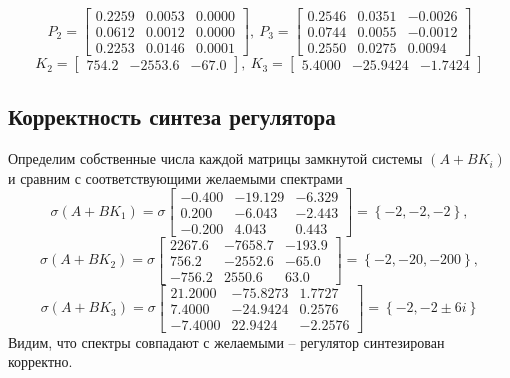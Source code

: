 \documentclass[a4paper, 12pt]{article}
\begin{document}
    $$
    P_2=\begin{bmatrix}
    0.2259    &0.0053    &0.0000\\
    0.0612    &0.0012    &0.0000\\
    0.2253    &0.0146    &0.0001
    \end{bmatrix},\ P_3=\begin{bmatrix}
    0.2546    &0.0351   &-0.0026\\
    0.0744    &0.0055   &-0.0012\\
    0.2550    &0.0275    &0.0094
    \end{bmatrix}
    $$
    $$
    K_2=\begin{bmatrix}
        754.2 &-2553.6 &-67.0
    \end{bmatrix},\ K_3=\begin{bmatrix}
        5.4000  &-25.9424   &-1.7424
    \end{bmatrix}
    $$


    \subsection{Корректность синтеза регулятора}
    Определим собственные числа каждой матрицы замкнутой системы $\left(A+BK_i\right)$ и
    сравним с соответствующими желаемыми спектрами
    $$
    \sigma\left(A+BK_1\right)=\sigma\begin{bmatrix}
    -0.400  &-19.129   &-6.329\\
    0.200   &-6.043   &-2.443\\
   -0.200    &4.043    &0.443
    \end{bmatrix}=\left\{-2,-2,-2\right\},
    $$
    $$
    \sigma\left(A+BK_2\right)=\sigma\begin{bmatrix}
    2267.6   &-7658.7   &-193.9\\
    756.2   &-2552.6   &-65.0\\
   -756.2    &2550.6    &63.0
    \end{bmatrix}=\left\{-2,-20,-200\right\},
    $$
    $$
    \sigma\left(A+BK_3\right)=\sigma\begin{bmatrix}
    21.2000  &-75.8273    &1.7727\\
    7.4000  &-24.9424    &0.2576\\
   -7.4000   &22.9424   &-2.2576
    \end{bmatrix}=\left\{-2,-2\pm6i\right\}
    $$
    Видим, что спектры совпадают с желаемыми -- регулятор синтезирован корректно.
\end{document}
